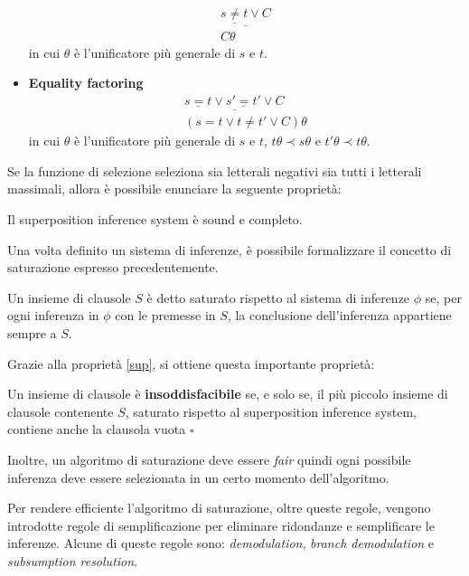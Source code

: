 \begin{definition}
\begin{itemize}
\begin{equation}
\begin{gathered}
                \underline{\underline{s\neq t} \lor C}\\
                C\theta
            \end{gathered}
        \end{equation}
        in cui $\theta$ è l'unificatore più generale di $s$ e $t$.
        \item \textbf{Equality factoring}
        \begin{equation}
            \begin{gathered}
                \underline{\underline{s=t} \lor \underline{s'=t'}\lor C}\\
                (s=t \lor t\neq t' \lor C)\theta
            \end{gathered}
        \end{equation}
        in cui $\theta$ è l'unificatore più generale di $s$ e $t$, $t\theta \prec s\theta$ e $t'\theta\prec t\theta$.
    \end{itemize}
\end{definition}
Se la funzione di selezione seleziona sia letterali negativi sia tutti i letterali massimali, allora è possibile enunciare la seguente proprietà: 
\begin{property}\label{sup}
    Il superposition inference system è sound e completo.
\end{property}
Una volta definito un sistema di inferenze, è possibile formalizzare il concetto di saturazione espresso precedentemente.
\begin{definition}
    Un insieme di clausole $S$ è detto saturato rispetto al sistema di inferenze $\phi$ se, 
    per ogni inferenza in $\phi$ con le premesse in $S$, la conclusione dell'inferenza appartiene sempre
    a $S$. 
\end{definition}
Grazie alla proprietà \ref{sup}, si ottiene questa importante proprietà:
\begin{property}
    Un insieme di clausole è \textbf{insoddisfacibile} se, e solo se, il più piccolo insieme di clausole contenente $S$, saturato 
    rispetto al superposition inference system, contiene anche la clausola vuota $\square$
\end{property}
Inoltre, un algoritmo di saturazione deve essere \emph{fair} quindi ogni possibile inferenza deve essere selezionata
in un certo momento dell'algoritmo.

Per rendere efficiente l'algoritmo di saturazione, oltre queste regole, vengono introdotte
regole di semplificazione per eliminare ridondanze e semplificare le inferenze. Alcune di queste regole sono: \emph{demodulation},
\emph{branch demodulation} e \emph{subsumption resolution}. 

